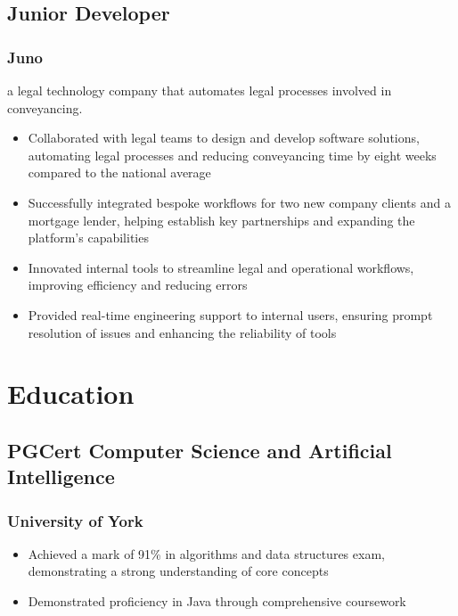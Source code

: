 \documentclass{article}
\begin{document}
\begin{paracol}{2}
  \subsection{Junior Developer}
  \subsubsection{Juno}
  {\color{LightGrey}\scriptsize\href{https://www.juno.legal}{\faExternalLink}}
  \hspace*{\fill}{\color{TitleGrey}{\scriptsize\faCalendar}\hspace{5pt}{\small10/2021 -- 12/2022}}
  
  {\noindent\small a legal technology company that automates legal processes involved in conveyancing.}
  \begin{itemize}[leftmargin=*]
    \setlength\itemsep{-2pt}
    \item Collaborated with legal teams to design and develop software solutions, automating legal processes and reducing conveyancing time by eight weeks compared to the national average
    \item Successfully integrated bespoke workflows for two new company clients and a mortgage lender, helping establish key partnerships and expanding the platform's capabilities
    \item Innovated internal tools to streamline legal and operational workflows, improving efficiency and reducing errors
    \item Provided real-time engineering support to internal users, ensuring prompt resolution of issues and enhancing the reliability of tools
  \end{itemize}

  \section{Education}
  \subsection{PGCert Computer Science and Artificial Intelligence}
  \subsubsection{University of York}
  \hspace*{\fill}{\small Awarded 2023}
  \begin{itemize}[leftmargin=*]
    \setlength\itemsep{-2pt}
    \item Achieved a mark of 91\% in algorithms and data structures exam, demonstrating a strong understanding of core concepts
    \item Demonstrated proficiency in Java through comprehensive coursework
  \end{itemize}


\end{paracol}
\end{document}
